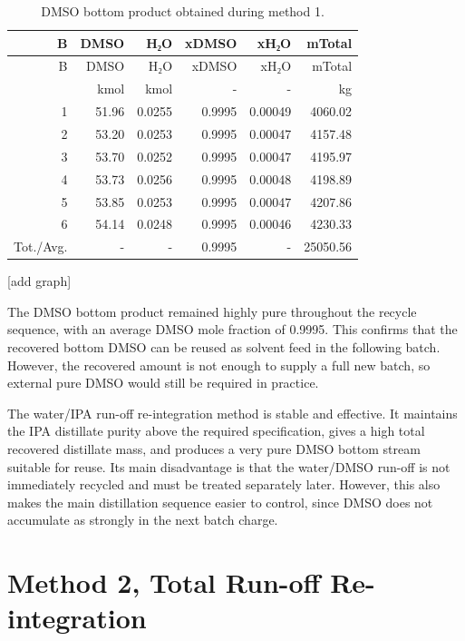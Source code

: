\begin{longtable}[]{@{}rrrrrr@{}}
\caption{DMSO bottom product obtained during method 1.
\label{tab:DMSO bottom product obtained during method 1}}\tabularnewline
\toprule\noalign{}
B & DMSO & H₂O & xDMSO & xH₂O & mTotal \\
\midrule\noalign{}
\endfirsthead
\toprule\noalign{}
B & DMSO & H₂O & xDMSO & xH₂O & mTotal \\
\midrule\noalign{}
\endhead
\bottomrule\noalign{}
\endlastfoot
& kmol & kmol & - & - & kg \\
1 & 51.96 & 0.0255 & 0.9995 & 0.00049 & 4060.02 \\
2 & 53.20 & 0.0253 & 0.9995 & 0.00047 & 4157.48 \\
3 & 53.70 & 0.0252 & 0.9995 & 0.00047 & 4195.97 \\
4 & 53.73 & 0.0256 & 0.9995 & 0.00048 & 4198.89 \\
5 & 53.85 & 0.0253 & 0.9995 & 0.00047 & 4207.86 \\
6 & 54.14 & 0.0248 & 0.9995 & 0.00046 & 4230.33 \\
Tot./Avg. & - & - & 0.9995 & - & 25050.56 \\
\end{longtable}

{[}add graph{]}

The DMSO bottom product remained highly pure throughout the recycle
sequence, with an average DMSO mole fraction of 0.9995. This confirms
that the recovered bottom DMSO can be reused as solvent feed in the
following batch. However, the recovered amount is not enough to supply a
full new batch, so external pure DMSO would still be required in
practice.

The water/IPA run-off re-integration method is stable and effective. It
maintains the IPA distillate purity above the required specification,
gives a high total recovered distillate mass, and produces a very pure
DMSO bottom stream suitable for reuse. Its main disadvantage is that the
water/DMSO run-off is not immediately recycled and must be treated
separately later. However, this also makes the main distillation
sequence easier to control, since DMSO does not accumulate as strongly
in the next batch charge.

\section{Method 2, Total Run-off
Re-integration}\label{method-2-total-run-off-re-integration}

